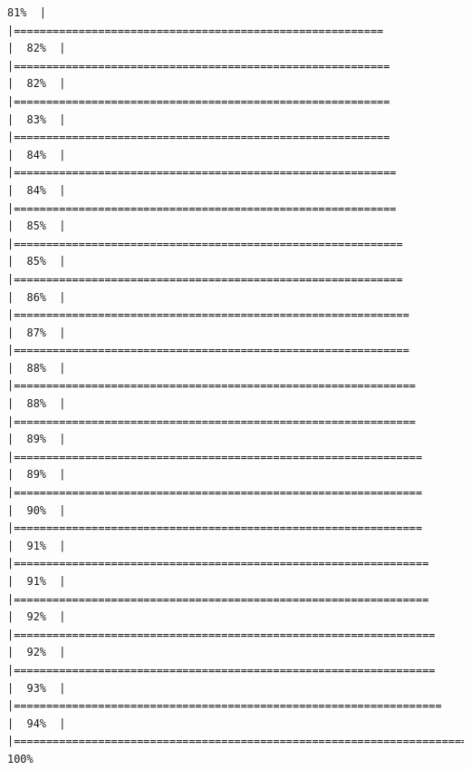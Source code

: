 \documentclass[
  english,
  man,a4paper,mask,floatsintext]{apa6}
\begin{document}
\begin{verbatim}
81%  |                                                                              |=========================================================             |  82%  |                                                                              |==========================================================            |  82%  |                                                                              |==========================================================            |  83%  |                                                                              |==========================================================            |  84%  |                                                                              |===========================================================           |  84%  |                                                                              |===========================================================           |  85%  |                                                                              |============================================================          |  85%  |                                                                              |============================================================          |  86%  |                                                                              |=============================================================         |  87%  |                                                                              |=============================================================         |  88%  |                                                                              |==============================================================        |  88%  |                                                                              |==============================================================        |  89%  |                                                                              |===============================================================       |  89%  |                                                                              |===============================================================       |  90%  |                                                                              |===============================================================       |  91%  |                                                                              |================================================================      |  91%  |                                                                              |================================================================      |  92%  |                                                                              |=================================================================     |  92%  |                                                                              |=================================================================     |  93%  |                                                                              |==================================================================    |  94%  |                                                                              |======================================================================| 100%

\end{verbatim}
\end{document}
